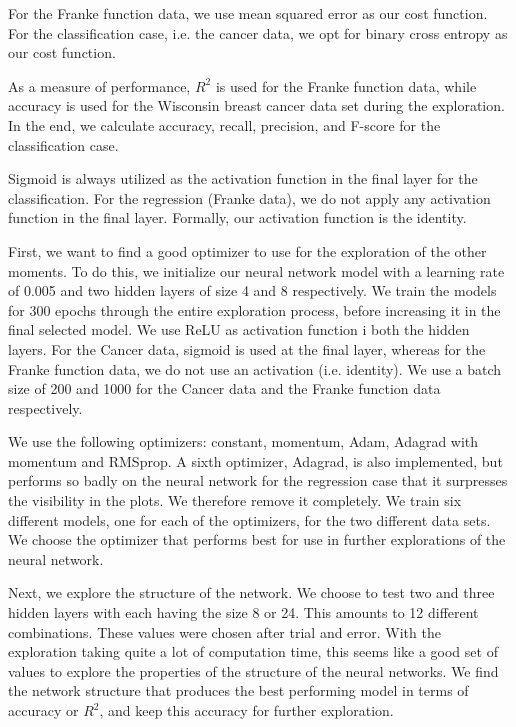 For the Franke function data, we use mean squared error as our cost function. For the classification case, i.e. the cancer data, we opt for binary cross entropy as our cost function.

As a measure of performance, $R^2$ is used for the Franke function data, while accuracy is used for the Wisconsin breast cancer data set during the exploration. 
In the end, we calculate accuracy, recall, precision, and F-score for the classification case. 

Sigmoid is always utilized as the activation function in the final layer for the classification. 
For the regression (Franke data), we do not apply any activation function in the final layer.
Formally, our activation function is the identity.

First, we want to find a good optimizer to use for the exploration of the other moments. 
To do this, we initialize our neural network model with a learning rate of 0.005 and two hidden layers of size 4 and 8 respectively. 
We train the models for 300 epochs through the entire exploration process, before increasing it in the final selected model. 
We use ReLU as activation function i both the hidden layers.
For the Cancer data, sigmoid is used at the final layer, whereas for the Franke function data, we do not use an activation (i.e. identity). 
We use a batch size of 200 and 1000 for the Cancer data and the Franke function data respectively.

We use the following optimizers: constant, momentum, Adam, Adagrad with momentum and RMSprop. 
A sixth optimizer, Adagrad, is also implemented, but performs so badly on the neural network for the regression case that it surpresses the visibility in the plots. 
We therefore remove it completely. 
We train six different models, one for each of the optimizers, for the two different data sets. 
We choose the optimizer that performs best for use in further explorations of the neural network. 

Next, we explore the structure of the network. We choose to test two and three hidden layers with each having the size 8 or 24. 
This amounts to 12 different combinations. 
These values were chosen after trial and error.
With the exploration taking quite a lot of computation time, this seems like a good set of values to explore the properties of the structure of the neural networks. 
We find the network structure that produces the best performing model in terms of accuracy or $R^2$, and keep this accuracy for further exploration. 

